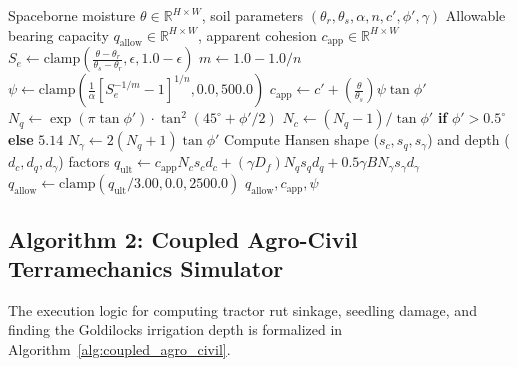 \documentclass[11pt,a4paper]{article}
\theoremstyle{definition}
\theoremstyle{remark}
\begin{document}
\begin{algorithm}[H]
\caption{Spaceborne Soil Mechanics \& Meyerhof-Hansen Bearing Capacity Pipeline}
\label{alg:bearing_capacity}
\begin{algorithmic}[1]
\Require Spaceborne moisture $\theta \in \mathbb{R}^{H \times W}$, soil parameters $(\theta_r, \theta_s, \alpha, n, c', \phi', \gamma)$
\Ensure Allowable bearing capacity $q_{\text{allow}} \in \mathbb{R}^{H \times W}$, apparent cohesion $c_{\text{app}} \in \mathbb{R}^{H \times W}$
\State $S_e \gets \text{clamp}\left( \frac{\theta - \theta_r}{\theta_s - \theta_r}, \epsilon, 1.0 - \epsilon \right)$ 
\State $m \gets 1.0 - 1.0 / n$
\State $\psi \gets \text{clamp}\left( \frac{1}{\alpha} \left[ S_e^{-1/m} - 1 \right]^{1/n}, 0.0, 500.0 \right)$ 
\State $c_{\text{app}} \gets c' + \left( \frac{\theta}{\theta_s} \right) \psi \tan \phi'$ 
\State $N_q \gets \exp(\pi \tan \phi') \cdot \tan^2(45^\circ + \phi'/2)$ 
\State $N_c \gets (N_q - 1) / \tan \phi'$ \textbf{if} $\phi' > 0.5^\circ$ \textbf{else} $5.14$
\State $N_\gamma \gets 2(N_q + 1) \tan \phi'$
\State Compute Hansen shape ($s_c, s_q, s_\gamma$) and depth ($d_c, d_q, d_\gamma$) factors
\State $q_{\text{ult}} \gets c_{\text{app}} N_c s_c d_c + (\gamma D_f) N_q s_q d_q + 0.5 \gamma B N_\gamma s_\gamma d_\gamma$
\State $q_{\text{allow}} \gets \text{clamp}\left( q_{\text{ult}} / 3.00, 0.0, 2500.0 \right)$ 
\State \Return $q_{\text{allow}}, c_{\text{app}}, \psi$
\end{algorithmic}
\end{algorithm}

\subsection{Algorithm 2: Coupled Agro-Civil Terramechanics Simulator}
The execution logic for computing tractor rut sinkage, seedling damage, and finding the Goldilocks irrigation depth is formalized in Algorithm~\ref{alg:coupled_agro_civil}.
\end{document}
